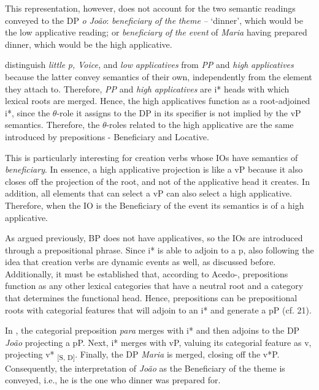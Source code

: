 \documentclass[output=paper,modfonts,nonflat]{langsci/langscibook}
\begin{document}
 

This representation, however, does not account for the two semantic readings conveyed to the DP \textit{o} \textit{João}: \textit{beneficiary} \textit{of} \textit{the} \textit{theme} \textit{–} ‘dinner’, which would be the low applicative reading; or \textit{beneficiary} \textit{of} \textit{the} \textit{event} of \textit{Maria} having prepared dinner, which would be the high applicative.

\citet{WoodMarantz2017} distinguish \textit{little} \textit{p,} \textit{Voice,} and \textit{low} \textit{applicatives} from \textit{PP} and \textit{high} \textit{applicatives} because the latter convey semantics of their own, independently from the element they attach to. Therefore, \textit{PP} and \textit{high} \textit{applicatives} are i* heads with which lexical roots are merged. Hence, the high applicatives function as a root-adjoined i*, since the ${\theta}${}-role it assigns to the DP in its specifier is not implied by the vP semantics. Therefore, the ${\theta}${}-roles related to the high applicative are the same introduced by prepositions - Beneficiary and Locative. 

This is particularly interesting for creation verbs whose IOs have semantics of \textit{beneficiary}. In essence, a high applicative projection is like a vP because it also closes off the projection of the root, and not of the applicative head it creates. In addition, all elements that can select a vP can also select a high applicative. Therefore, when the IO is the Beneficiary of the event its semantics is of a high applicative. 

As argued previously, BP does not have applicatives, so the IOs are introduced through a prepositional phrase. Since i* is able to adjoin to a p, also following the idea that creation verbs are dynamic events as well, as discussed before. Additionally, it must be established that, according to Acedo-\citet{Matéllan2010}, prepositions function as any other lexical categories that have a neutral root and a category that determines the functional head. Hence, prepositions can be prepositional roots with categorial features that will adjoin to an i* and generate a pP (cf. 21). 

\begin{styleHTMLPreformatted}
In , the categorial preposition \textit{para} merges with i* and then adjoins to the DP  \textit{João} projecting a pP. Next, i* merges with vP, valuing its categorial feature as v, projecting v* \textsubscript{[S, D]}. Finally, the DP \textit{Maria} is merged, closing off the v*P. Consequently, the interpretation of \textit{João} as the Beneficiary of the theme is conveyed, i.e., he is the one who dinner was prepared for.
\end{styleHTMLPreformatted}
\end{document}
